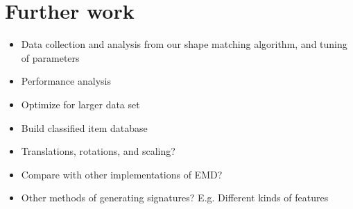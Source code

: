 \documentclass[10pt,a4paper]{article}
\begin{document}
\section{Further work}

\begin{itemize}
	\item Data collection and analysis from our shape matching algorithm, and tuning of parameters
	\item Performance analysis
	\item Optimize for larger data set
	\item Build classified item database
	\item Translations, rotations, and scaling?
	\item Compare with other implementations of EMD?
	\item Other methods of generating signatures? E.g. Different kinds of features
\end{itemize}
\end{document}
